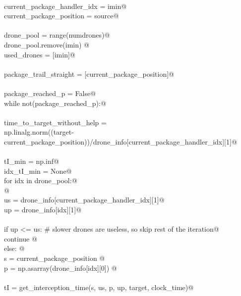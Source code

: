 \documentclass[10.0pt]{report}
\begin{document}
\begin{flushleft}
\begin{list}{}{}
\mbox{}\verb@@\\
\mbox{}\verb@    current_package_handler_idx = imin@\\
\mbox{}\verb@    current_package_position    = source@\\
\mbox{}\verb@@\\
\mbox{}\verb@    drone_pool = range(numdrones)@\\
\mbox{}\verb@    drone_pool.remove(imin) @\\
\mbox{}\verb@    used_drones = [imin]@\\
\mbox{}\verb@@\\
\mbox{}\verb@    package_trail_straight = [current_package_position]@\\
\mbox{}\verb@@\\
\mbox{}\verb@    package_reached_p   = False@\\
\mbox{}\verb@    while not(package_reached_p):@\\
\mbox{}\verb@@\\
\mbox{}\verb@          time_to_target_without_help =\@\\
\mbox{}\verb@              np.linalg.norm((target-current_package_position))/drone_info[current_package_handler_idx][1]@\\
\mbox{}\verb@@\\
\mbox{}\verb@          tI_min     = np.inf@\\
\mbox{}\verb@          idx_tI_min = None@\\
\mbox{}\verb@          for idx in drone_pool:@\\
\mbox{}\verb@              @\\
\mbox{}\verb@              us = drone_info[current_package_handler_idx][1]@\\
\mbox{}\verb@              up = drone_info[idx][1]@\\
\mbox{}\verb@@\\
\mbox{}\verb@              if up <= us: # slower drones are useless, so skip rest of the iteration@\\
\mbox{}\verb@                  continue @\\
\mbox{}\verb@              else: @\\
\mbox{}\verb@                s = current_package_position @\\
\mbox{}\verb@                p = np.asarray(drone_info[idx][0]) @\\
\mbox{}\verb@@\\
\mbox{}\verb@                tI = get_interception_time(s, us, p, up, target, clock_time)@\\

\end{list}
\end{flushleft}
\end{document}
